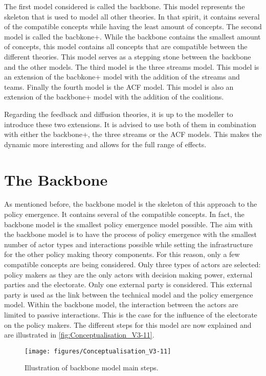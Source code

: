The first model considered is called the backbone. This model represents the skeleton that is used to model all other theories. In that spirit, it contains several of the compatible concepts while having the least amount of concepts. The second model is called the bacbkone+. While the backbone contains the smallest amount of concepts, this model contains all concepts that are compatible between the different theories. This model serves as a stepping stone between the backbone and the other models. The third model is the three streams model. This model is an extension of the bacbkone+ model with the addition of the streams and teams. Finally the fourth model is the ACF model. This model is also an extension of the backbone+ model with the addition of the coalitions.

Regarding the feedback and diffusion theories, it is up to the modeller to introduce these two extensions. It is advised to use both of them in combination with either the backbone+, the three streams or the ACF models. This makes the dynamic more interesting and allows for the full range of effects.


%
\section{The Backbone}
\label{sec:backbone}

As mentioned before, the backbone model is the skeleton of this approach to the policy emergence. It contains several of the compatible concepts. In fact, the backbone model is the smallest policy emergence model possible. The aim with the backbone model is to have the process of policy emergence with the smallest number of actor types and interactions possible while setting the infrastructure for the other policy making theory components. For this reason, only a few compatible concepts are being considered. Only three types of actors are selected: policy makers as they are the only actors with decision making power, external parties and the electorate. Only one external party is considered. This external party is used as the link between the technical model and the policy emergence model. Within the backbone model, the interaction between the actors are limited to passive interactions. This is the case for the influence of the electorate on the policy makers. The different steps for this model are now explained and are illustrated in \autoref{fig:Conceptualisation_V3-11}.

\begin{figure}
\centering
\texttt{[image: figures/Conceptualisation\_V3-11]}
\caption{Illustration of backbone model main steps.}
\label{fig:Conceptualisation_V3-11}
\end{figure}
 
